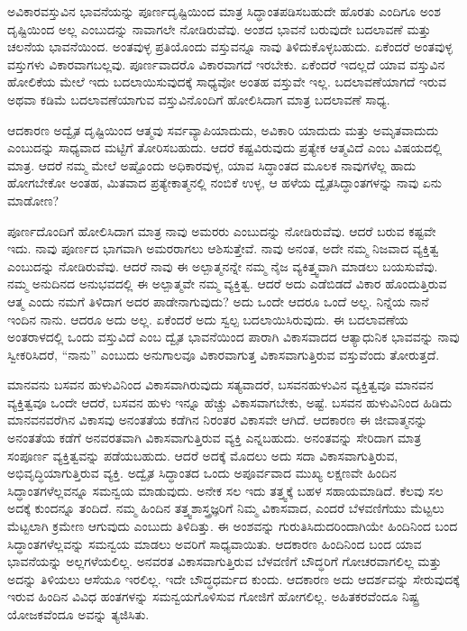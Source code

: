 \vskip 0.2cm

ಅವಿಕಾರವಸ್ತುವಿನ ಭಾವನೆಯನ್ನು ಪೂರ್ಣದೃಷ್ಟಿಯಿಂದ ಮಾತ್ರ ಸಿದ್ಧಾಂತಪಡಿಸ\break ಬಹುದೇ ಹೊರತು ಎಂದಿಗೂ ಅಂಶ ದೃಷ್ಟಿಯಿಂದ ಅಲ್ಲ ಎಂಬುದನ್ನು ನಾವಾಗಲೇ ನೋಡಿರುವೆವು. ಅಂಶದ ಭಾವನೆ ಬರುವುದೇ ಬದಲಾವಣೆ ಮತ್ತು ಚಲನೆಯ ಭಾವನೆಯಿಂದ. ಅಂತವುಳ್ಳ ಪ್ರತಿಯೊಂದು ವಸ್ತುವನ್ನೂ ನಾವು ತಿಳಿದುಕೊಳ್ಳಬಹುದು. ಏಕೆಂದರೆ ಅಂತವುಳ್ಳ ವಸ್ತುಗಳು ವಿಕಾರವಾಗಬಲ್ಲವು. ಪೂರ್ಣವಾದರೊ ವಿಕಾರವಾಗದೆ ಇರಬೇಕು. ಏಕೆಂದರೆ ಇದಲ್ಲದೆ ಯಾವ ವಸ್ತುವಿನ ಹೋಲಿಕೆಯ ಮೇಲೆ ಇದು ಬದಲಾಯಿಸುವುದಕ್ಕೆ ಸಾಧ್ಯವೋ ಅಂತಹ ವಸ್ತುವೇ ಇಲ್ಲ. ಬದಲಾವಣೆಯಾಗದೆ ಇರುವ ಅಥವಾ ಕಡಿಮೆ ಬದಲಾವಣೆಯಾಗುವ ವಸ್ತುವಿನೊಂದಿಗೆ ಹೋಲಿಸಿದಾಗ ಮಾತ್ರ ಬದಲಾವಣೆ ಸಾಧ್ಯ. 

\vskip 0.2cm

ಆದಕಾರಣ ಅದ್ವೈತ ದೃಷ್ಟಿಯಿಂದ ಆತ್ಮವು ಸರ್ವವ್ಯಾಪಿಯಾದುದು, ಅವಿಕಾರಿ ಯಾದುದು ಮತ್ತು ಅಮೃತವಾದುದು ಎಂಬುದನ್ನು ಸಾಧ್ಯವಾದ ಮಟ್ಟಿಗೆ ತೋರಿಸಬಹುದು. ಆದರೆ ಕಷ್ಟವಿರುವುದು ಪ್ರತ್ಯೇಕ ಆತ್ಮವಿದೆ ಎಂಬ ವಿಷಯದಲ್ಲಿ ಮಾತ್ರ. ಆದರೆ ನಮ್ಮ ಮೇಲೆ ಅಷ್ಟೊಂದು ಅಧಿಕಾರವುಳ್ಳ, ಯಾವ ಸಿದ್ಧಾಂತದ ಮೂಲಕ ನಾವುಗಳೆಲ್ಲ ಹಾದು ಹೋಗಬೇಕೋ ಅಂತಹ, ಮಿತವಾದ ಪ್ರತ್ಯೇಕಾತ್ಮನಲ್ಲಿ ನಂಬಿಕೆ ಉಳ್ಳ, ಆ ಹಳೆಯ ದ್ವೈತಸಿದ್ಧಾಂತಗಳನ್ನು ನಾವು ಏನು ಮಾಡೋಣ?


ಪೂರ್ಣದೊಂದಿಗೆ ಹೋಲಿಸಿದಾಗ ಮಾತ್ರ ನಾವು ಅಮರರು ಎಂಬುದನ್ನು ನೋಡಿರುವೆವು. ಆದರೆ ಬರುವ ಕಷ್ಟವೇ ಇದು. ನಾವು ಪೂರ್ಣದ ಭಾಗವಾಗಿ ಅಮರರಾಗಲು ಆಶಿಸುತ್ತೇವೆ. ನಾವು ಅನಂತ, ಅದೇ ನಮ್ಮ ನಿಜವಾದ ವ್ಯಕ್ತಿತ್ವ ಎಂಬುದನ್ನು ನೋಡಿರುವೆವು. ಆದರೆ ನಾವು ಈ ಅಲ್ಪಾತ್ಮನನ್ನೇ ನಮ್ಮ ನೈಜ ವ್ಯಕಿತ್ತ್ವವಾಗಿ ಮಾಡಲು ಬಯಸುವೆವು. ನಮ್ಮ ಅನುದಿನದ ಅನುಭವದಲ್ಲಿ ಈ ಅಲ್ಪಾತ್ಮವೇ ನಮ್ಮ ವ್ಯಕ್ತಿತ್ವ. ಆದರೆ ಅದು ಎಡೆಬಿಡದೆ ವಿಕಾರ ಹೊಂದುತ್ತಿರುವ ಆತ್ಮ ಎಂದು ನಮಗೆ ತಿಳಿದಾಗ ಅದರ ಪಾಡೇನಾಗುವುದು? ಅದು ಒಂದೇ ಆದರೂ ಒಂದೆ ಅಲ್ಲ. ನಿನ್ನೆಯ ನಾನೆ ಇಂದಿನ ನಾನು. ಆದರೂ ಅದು ಅಲ್ಲ. ಏಕೆಂದರೆ ಅದು ಸ್ವಲ್ಪ ಬದಲಾಯಿಸಿರುವುದು. ಈ ಬದಲಾವಣೆಯ ಅಂತರಾಳದಲ್ಲಿ ಒಂದು ವಸ್ತುವಿದೆ ಎಂಬ ದ್ವೈತ ಭಾವನೆಯಿಂದ ಪಾರಾಗಿ ವಿಕಾಸವಾದದ ಆತ್ಯಾಧುನಿಕ ಭಾವವನ್ನು ನಾವು ಸ್ವೀಕರಿಸಿದರೆ, “ನಾನು” ಎಂಬುದು ಅನುಗಾಲವೂ ವಿಕಾರವಾಗುತ್ತ ವಿಕಾಸವಾಗುತ್ತಿರುವ ವಸ್ತುವೆಂದು ತೋರುತ್ತದೆ. 


ಮಾನವನು ಬಸವನ ಹುಳುವಿನಿಂದ ವಿಕಾಸವಾಗಿರುವುದು ಸತ್ಯವಾದರೆ, ಬಸವನಹುಳುವಿನ ವ್ಯಕ್ತಿತ್ವವೂ ಮಾನವನ ವ್ಯಕ್ತಿತ್ವವೂ ಒಂದೇ ಆದರೆ, ಬಸವನ ಹುಳು ಇನ್ನೂ ಹೆಚ್ಚು ವಿಕಾಸವಾಗಬೇಕು, ಅಷ್ಟೆ. ಬಸವನ ಹುಳುವಿನಿಂದ ಹಿಡಿದು ಮಾನವನವರೆಗಿನ ವಿಕಾಸವು ಅನಂತತೆಯ ಕಡೆಗಿನ ನಿರಂತರ ವಿಕಾಸವೇ ಆಗಿದೆ. ಆದಕಾರಣ ಈ ಜೀವಾತ್ಮನನ್ನು ಅನಂತತೆಯ ಕಡೆಗೆ ಅನವರತವಾಗಿ ವಿಕಾಸವಾಗುತ್ತಿರುವ ವ್ಯಕ್ತಿ ಎನ್ನಬಹುದು. ಅನಂತವನ್ನು ಸೇರಿದಾಗ ಮಾತ್ರ ಸಂಪೂರ್ಣ ವ್ಯಕ್ತಿತ್ವವನ್ನು ಪಡೆಯಬಹುದು. ಆದರೆ ಅದಕ್ಕೆ ಮೊದಲು ಅದು ಸದಾ ವಿಕಾಸವಾಗುತ್ತಿರುವ, ಅಭಿವೃದ್ಧಿಯಾಗುತ್ತಿರುವ ವ್ಯಕ್ತಿ. ಅದ್ವೈತ ಸಿದ್ಧಾಂತದ ಒಂದು ಅಪೂರ್ವವಾದ ಮುಖ್ಯ ಲಕ್ಷಣವೇ ಹಿಂದಿನ ಸಿದ್ಧಾಂತಗಳೆಲ್ಲವನ್ನೂ ಸಮನ್ವಯ ಮಾಡುವುದು. ಅನೇಕ ಸಲ ಇದು ತತ್ತ್ವಕ್ಕೆ ಬಹಳ ಸಹಾಯಮಾಡಿದೆ. ಕೆಲವು ಸಲ ಅದಕ್ಕೆ ಕುಂದನ್ನೂ ತಂದಿದೆ. ನಮ್ಮ ಹಿಂದಿನ ತತ್ತ್ವಶಾಸ್ತ್ರಜ್ಞರಿಗೆ ನಿಮ್ಮ ವಿಕಾಸವಾದ, ಎಂದರೆ ಬೆಳವಣಿಗೆಯು ಮೆಟ್ಟಲು ಮೆಟ್ಟಲಾಗಿ ಕ್ರಮೇಣ ಆಗುವುದು ಎಂಬುದು ತಿಳಿದಿತ್ತು. ಈ ಅಂಶವನ್ನು ಗುರುತಿಸಿದುದರಿಂದಾಗಿಯೇ ಹಿಂದಿನಿಂದ ಬಂದ ಸಿದ್ಧಾಂತಗಳೆಲ್ಲವನ್ನು ಸಮನ್ವಯ ಮಾಡಲು ಅವರಿಗೆ ಸಾಧ್ಯವಾಯಿತು. ಆದಕಾರಣ ಹಿಂದಿನಿಂದ ಬಂದ ಯಾವ ಭಾವನೆಯನ್ನು ಅಲ್ಲಗಳೆಯಲಿಲ್ಲ. ಅನವರತ ವಿಕಾಸವಾಗುತ್ತಿರುವ ಬೆಳವಣಿಗೆ ಬೌದ್ಧರಿಗೆ ಗೋಚರವಾಗಲಿಲ್ಲ ಮತ್ತು ಅದನ್ನು ತಿಳಿಯಲು ಆಸೆಯೂ ಇರಲಿಲ್ಲ. ಇದೇ ಬೌದ್ಧಧರ್ಮದ ಕುಂದು. ಆದಕಾರಣ ಅದು ಆದರ್ಶವನ್ನು ಸೇರುವುದಕ್ಕೆ ಇರುವ ಹಿಂದಿನ ವಿವಿಧ ಹಂತಗಳನ್ನು ಸಮನ್ವಯಗೊಳಿಸುವ ಗೋಜಿಗೆ ಹೋಗಲಿಲ್ಲ. ಅಹಿತಕರವೆಂದೂ ನಿಷ್ಟ್ರ ಯೋಜಕವೆಂದೂ ಅವನ್ನು ತ್ಯಜಿಸಿತು. 

